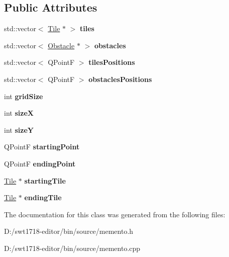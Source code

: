 \subsection*{Public Attributes}
\begin{DoxyCompactItemize}
\item 
\mbox{\label{class_memento_a8d2d39306fc5be619c4d83c3d31c30ee}} 
std\+::vector$<$ \mbox{\hyperlink{class_tile}{Tile}} $\ast$ $>$ {\bfseries tiles}
\item 
\mbox{\label{class_memento_aeaaea7dde0c7d891caacdb00e1433165}} 
std\+::vector$<$ \mbox{\hyperlink{class_obstacle}{Obstacle}} $\ast$ $>$ {\bfseries obstacles}
\item 
\mbox{\label{class_memento_ad6a0dbbbf25e19798eb64cd801b4f87e}} 
std\+::vector$<$ Q\+PointF $>$ {\bfseries tiles\+Positions}
\item 
\mbox{\label{class_memento_a01794dba2c7c57390189a960911a2303}} 
std\+::vector$<$ Q\+PointF $>$ {\bfseries obstacles\+Positions}
\item 
\mbox{\label{class_memento_a79535358653a62fb73c323685e775d7c}} 
int {\bfseries grid\+Size}
\item 
\mbox{\label{class_memento_a2ac79beed000564c9ee21323f95a82dc}} 
int {\bfseries sizeX}
\item 
\mbox{\label{class_memento_a57986db3e6684ebee444f7d5059ae2dd}} 
int {\bfseries sizeY}
\item 
\mbox{\label{class_memento_a77fe5ca9dd906d5ce8492b25e9457bdb}} 
Q\+PointF {\bfseries starting\+Point}
\item 
\mbox{\label{class_memento_af84fdfb3bcbfaedc18fcb5d2f13a20eb}} 
Q\+PointF {\bfseries ending\+Point}
\item 
\mbox{\label{class_memento_a7716988af522123607a444e9c68a245a}} 
\mbox{\hyperlink{class_tile}{Tile}} $\ast$ {\bfseries starting\+Tile}
\item 
\mbox{\label{class_memento_af773246a2064cfecd40738f736a01b56}} 
\mbox{\hyperlink{class_tile}{Tile}} $\ast$ {\bfseries ending\+Tile}
\end{DoxyCompactItemize}


The documentation for this class was generated from the following files\+:\begin{DoxyCompactItemize}
\item 
D\+:/swt1718-\/editor/bin/source/memento.\+h\item 
D\+:/swt1718-\/editor/bin/source/memento.\+cpp\end{DoxyCompactItemize}

